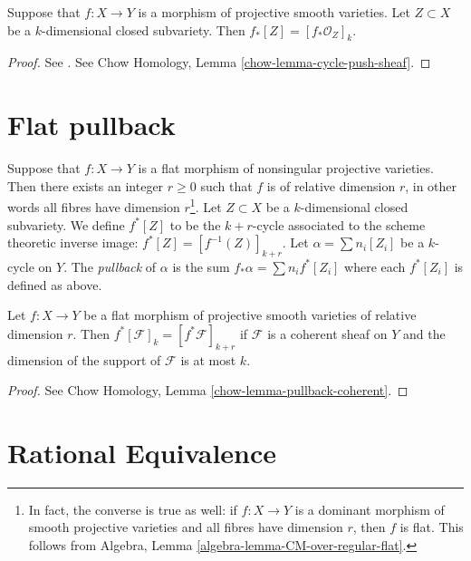 \begin{lemma}
\label{lemma-push-coherent}
Suppose that $f : X \to Y$ is a morphism of projective smooth varieties.
Let $Z \subset X$ be a $k$-dimensional closed subvariety. Then
$f_*[Z] = [f_*\mathcal{O}_Z]_k$.
\end{lemma}

\begin{proof}
See \cite[Chapter V]{Serre_algebre_locale}.
See Chow Homology, Lemma \ref{chow-lemma-cycle-push-sheaf}.
\end{proof}


\section{Flat pullback}
\label{section-flat-pullback}

\noindent
Suppose that $f : X \to Y$ is a flat morphism of nonsingular projective
varieties. Then there exists an integer $r \geq 0$ such that $f$ is of
relative dimension $r$, in other words all fibres have dimension
$r$\footnote{In fact, the converse is true as well: if $f : X \to Y$ is
a dominant morphism of smooth projective varieties and all fibres have
dimension $r$, then $f$ is flat. This follows from
Algebra, Lemma \ref{algebra-lemma-CM-over-regular-flat}.}.
Let $Z \subset X$ be a $k$-dimensional closed subvariety. We define
$f^*[Z]$ to be the $k + r$-cycle associated to the scheme theoretic
inverse image: $f^*[Z] = [f^{-1}(Z)]_{k + r}$. Let
$\alpha = \sum n_i [Z_i]$ be a $k$-cycle on $Y$. The {\it pullback} of
$\alpha$ is the sum $f_* \alpha = \sum n_i f^*[Z_i]$ where each $f^*[Z_i]$
is defined as above.

\begin{lemma}
\label{lemma-pullback}
Let $f : X \to Y$ be a flat morphism of projective smooth varieties
of relative dimension $r$.
Then $f^*[\mathcal{F}]_k = [f^*\mathcal{F}]_{k + r}$
if $\mathcal{F}$ is a coherent sheaf on $Y$ and the dimension of the
support of $\mathcal{F}$ is at most $k$.
\end{lemma}

\begin{proof}
See Chow Homology, Lemma \ref{chow-lemma-pullback-coherent}.
\end{proof}


\section{Rational Equivalence}
\label{section-rational-equivalence}

